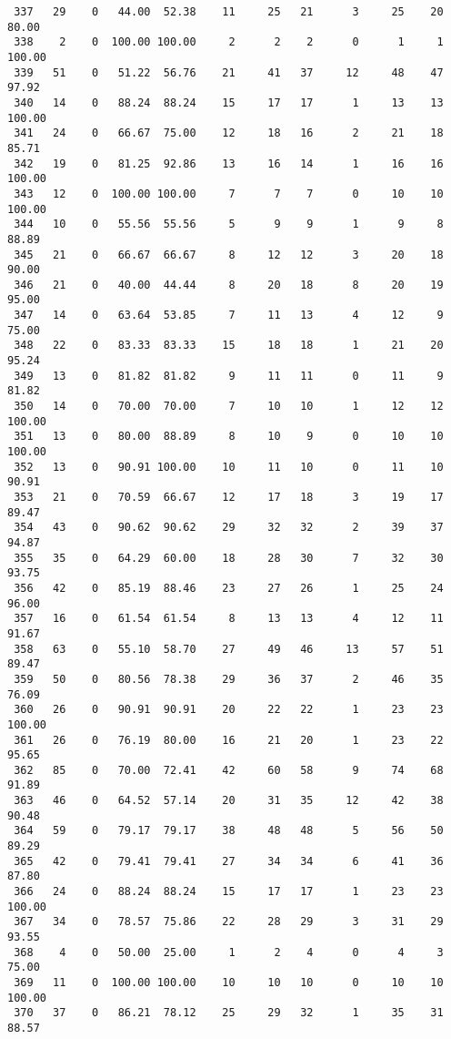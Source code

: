 \begin{verbatim}
 337   29    0   44.00  52.38    11     25   21      3     25    20    80.00
 338    2    0  100.00 100.00     2      2    2      0      1     1   100.00
 339   51    0   51.22  56.76    21     41   37     12     48    47    97.92
 340   14    0   88.24  88.24    15     17   17      1     13    13   100.00
 341   24    0   66.67  75.00    12     18   16      2     21    18    85.71
 342   19    0   81.25  92.86    13     16   14      1     16    16   100.00
 343   12    0  100.00 100.00     7      7    7      0     10    10   100.00
 344   10    0   55.56  55.56     5      9    9      1      9     8    88.89
 345   21    0   66.67  66.67     8     12   12      3     20    18    90.00
 346   21    0   40.00  44.44     8     20   18      8     20    19    95.00
 347   14    0   63.64  53.85     7     11   13      4     12     9    75.00
 348   22    0   83.33  83.33    15     18   18      1     21    20    95.24
 349   13    0   81.82  81.82     9     11   11      0     11     9    81.82
 350   14    0   70.00  70.00     7     10   10      1     12    12   100.00
 351   13    0   80.00  88.89     8     10    9      0     10    10   100.00
 352   13    0   90.91 100.00    10     11   10      0     11    10    90.91
 353   21    0   70.59  66.67    12     17   18      3     19    17    89.47
 354   43    0   90.62  90.62    29     32   32      2     39    37    94.87
 355   35    0   64.29  60.00    18     28   30      7     32    30    93.75
 356   42    0   85.19  88.46    23     27   26      1     25    24    96.00
 357   16    0   61.54  61.54     8     13   13      4     12    11    91.67
 358   63    0   55.10  58.70    27     49   46     13     57    51    89.47
 359   50    0   80.56  78.38    29     36   37      2     46    35    76.09
 360   26    0   90.91  90.91    20     22   22      1     23    23   100.00
 361   26    0   76.19  80.00    16     21   20      1     23    22    95.65
 362   85    0   70.00  72.41    42     60   58      9     74    68    91.89
 363   46    0   64.52  57.14    20     31   35     12     42    38    90.48
 364   59    0   79.17  79.17    38     48   48      5     56    50    89.29
 365   42    0   79.41  79.41    27     34   34      6     41    36    87.80
 366   24    0   88.24  88.24    15     17   17      1     23    23   100.00
 367   34    0   78.57  75.86    22     28   29      3     31    29    93.55
 368    4    0   50.00  25.00     1      2    4      0      4     3    75.00
 369   11    0  100.00 100.00    10     10   10      0     10    10   100.00
 370   37    0   86.21  78.12    25     29   32      1     35    31    88.57

\end{verbatim}
